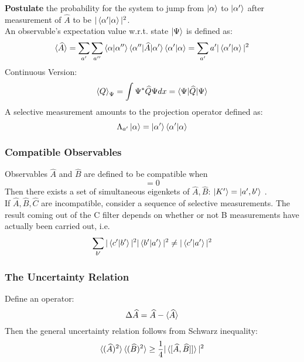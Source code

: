 \documentclass[a4paper, 11pt]{article}
\begin{document}
\indent \textbf{Postulate} the probability for the system to jump from $\ket{\alpha}$ to $\ket{\alpha'}$ after measurement of $\widehat{A}$ to be $|\braket{\alpha'|\alpha}|^2$. \\

\indent An observable's expectation value w.r.t. state $\ket{\Psi}$ is defined as:
\begin{equation}
	\braket{\widehat{A}} = \sum_{a'}\sum_{a''}\braket{\alpha|\alpha''}\braket{\alpha''|\widehat{A}|\alpha'}\braket{\alpha'|\alpha} = \sum_{a'}a'|\braket{\alpha'|\alpha}|^2
\end{equation}
Continuous Version:
\begin{equation}
	\braket{Q}_{\Psi} = \int\Psi^* \widehat{Q} \Psi dx = \braket{\Psi|\widehat{Q}|\Psi}
\end{equation}
\indent A selective measurement amounts to the projection operator defined as:
\begin{equation}
\Lambda_{a'}\ket{\alpha} = \ket{\alpha'}\braket{\alpha'|\alpha}
\end{equation}

\subsubsection{Compatible Observables}
Observables $\widehat{A}$ and $\widehat{B}$ are defined to be compatible when
\begin{equation}
	[\widehat{A}, \widehat{B}] = 0
\end{equation}
Then there exists a set of simultaneous eigenkets of $\widehat{A}, \widehat{B}$: $\ket{K'} = \ket{a', b'}$ . \\
\indent If $\widehat{A}, \widehat{B}, \widehat{C}$ are incompatible, consider a sequence of selective measurements. The result coming out of the C filter depends on whether or not B measurements have actually been carried out, i.e.
\begin{equation}
\sum_{b'}|\braket{c'|b'}|^2 |\braket{b'|a'}|^2 \neq |\braket{c'|a'}|^2
\end{equation}

\subsubsection{The Uncertainty Relation}
Define an operator:
\begin{equation}
\Delta \widehat{A} = \widehat{A} - \braket{\widehat{A}}
\end{equation}
Then the general uncertainty relation follows from Schwarz inequality:
\begin{equation}
\braket{(\widehat{A})^2} \braket{(\widehat{B})^2} \geq \frac{1}{4} |\braket{[\widehat{A}, \widehat{B}]]}|^2
\end{equation}
\end{document}
